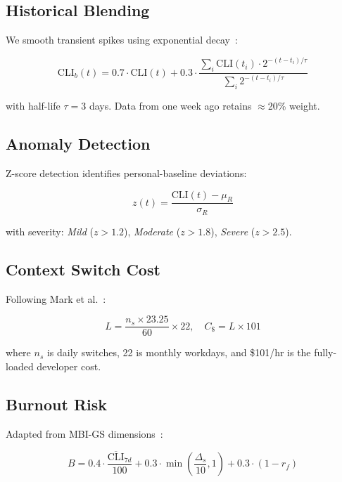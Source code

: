 \documentclass[conference]{IEEEtran}
\begin{document}
\subsection{Historical Blending}

We smooth transient spikes using exponential decay~\cite{brown1956exponential}:

\begin{equation}
\text{CLI}_b(t) = 0.7 \cdot \text{CLI}(t) + 0.3 \cdot \frac{\sum_i \text{CLI}(t_i) \cdot 2^{-(t-t_i)/\tau}}{\sum_i 2^{-(t-t_i)/\tau}}
\label{eq:blend}
\end{equation}

with half-life $\tau = 3$ days. Data from one week ago retains $\approx$20\% weight.

\subsection{Anomaly Detection}

Z-score detection identifies personal-baseline deviations:

\begin{equation}
z(t) = \frac{\text{CLI}(t) - \mu_R}{\sigma_R}
\label{eq:anom}
\end{equation}

with severity: \emph{Mild} ($z > 1.2$), \emph{Moderate} ($z > 1.8$), \emph{Severe} ($z > 2.5$).

\subsection{Context Switch Cost}

Following Mark et al.~\cite{mark2008cost}:

\begin{equation}
L = \frac{n_s \times 23.25}{60} \times 22, \quad C_\$ = L \times 101
\label{eq:cost}
\end{equation}

where $n_s$ is daily switches, 22 is monthly workdays, and \$101/hr is the fully-loaded developer cost.

\subsection{Burnout Risk}

Adapted from MBI-GS dimensions~\cite{maslach1996maslach}:

\begin{equation}
B = 0.4 \cdot \frac{\overline{\text{CLI}}_{7d}}{100} + 0.3 \cdot \min\!\left(\frac{\Delta_s}{10}, 1\right) + 0.3 \cdot (1 - r_f)
\label{eq:burn}
\end{equation}
\end{document}

